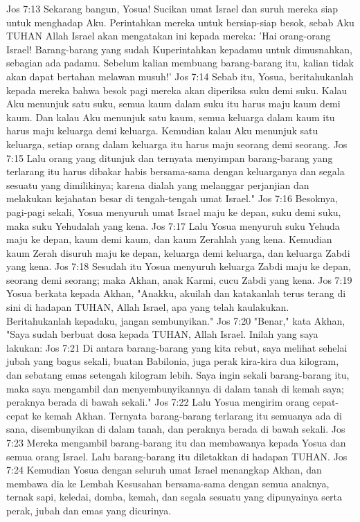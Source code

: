 Jos 7:13  Sekarang bangun, Yosua! Sucikan umat Israel dan suruh mereka siap untuk menghadap Aku. Perintahkan mereka untuk bersiap-siap besok, sebab Aku TUHAN Allah Israel akan mengatakan ini kepada mereka: 'Hai orang-orang Israel! Barang-barang yang sudah Kuperintahkan kepadamu untuk dimusnahkan, sebagian ada padamu. Sebelum kalian membuang barang-barang itu, kalian tidak akan dapat bertahan melawan musuh!'
Jos 7:14  Sebab itu, Yosua, beritahukanlah kepada mereka bahwa besok pagi mereka akan diperiksa suku demi suku. Kalau Aku menunjuk satu suku, semua kaum dalam suku itu harus maju kaum demi kaum. Dan kalau Aku menunjuk satu kaum, semua keluarga dalam kaum itu harus maju keluarga demi keluarga. Kemudian kalau Aku menunjuk satu keluarga, setiap orang dalam keluarga itu harus maju seorang demi seorang.
Jos 7:15  Lalu orang yang ditunjuk dan ternyata menyimpan barang-barang yang terlarang itu harus dibakar habis bersama-sama dengan keluarganya dan segala sesuatu yang dimilikinya; karena dialah yang melanggar perjanjian dan melakukan kejahatan besar di tengah-tengah umat Israel."
Jos 7:16  Besoknya, pagi-pagi sekali, Yosua menyuruh umat Israel maju ke depan, suku demi suku, maka suku Yehudalah yang kena.
Jos 7:17  Lalu Yosua menyuruh suku Yehuda maju ke depan, kaum demi kaum, dan kaum Zerahlah yang kena. Kemudian kaum Zerah disuruh maju ke depan, keluarga demi keluarga, dan keluarga Zabdi yang kena.
Jos 7:18  Sesudah itu Yosua menyuruh keluarga Zabdi maju ke depan, seorang demi seorang; maka Akhan, anak Karmi, cucu Zabdi yang kena.
Jos 7:19  Yosua berkata kepada Akhan, "Anakku, akuilah dan katakanlah terus terang di sini di hadapan TUHAN, Allah Israel, apa yang telah kaulakukan. Beritahukanlah kepadaku, jangan sembunyikan."
Jos 7:20  "Benar," kata Akhan, "Saya sudah berbuat dosa kepada TUHAN, Allah Israel. Inilah yang saya lakukan:
Jos 7:21  Di antara barang-barang yang kita rebut, saya melihat sehelai jubah yang bagus sekali, buatan Babilonia, juga perak kira-kira dua kilogram, dan sebatang emas setengah kilogram lebih. Saya ingin sekali barang-barang itu, maka saya mengambil dan menyembunyikannya di dalam tanah di kemah saya; peraknya berada di bawah sekali."
Jos 7:22  Lalu Yosua mengirim orang cepat-cepat ke kemah Akhan. Ternyata barang-barang terlarang itu semuanya ada di sana, disembunyikan di dalam tanah, dan peraknya berada di bawah sekali.
Jos 7:23  Mereka mengambil barang-barang itu dan membawanya kepada Yosua dan semua orang Israel. Lalu barang-barang itu diletakkan di hadapan TUHAN.
Jos 7:24  Kemudian Yosua dengan seluruh umat Israel menangkap Akhan, dan membawa dia ke Lembah Kesusahan bersama-sama dengan semua anaknya, ternak sapi, keledai, domba, kemah, dan segala sesuatu yang dipunyainya serta perak, jubah dan emas yang dicurinya.
